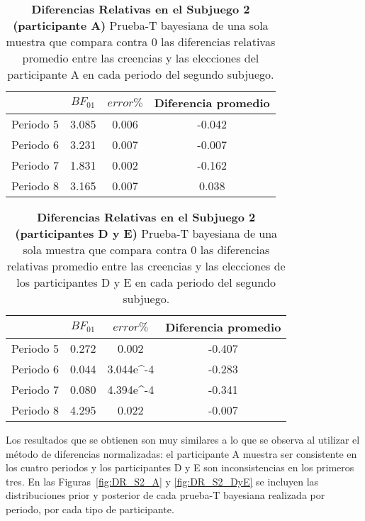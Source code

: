 \begin{table}[h]
\caption[Subjuego 2. Diferencias Relativas. Participante A.]{\textbf{Diferencias Relativas en el Subjuego 2 (participante A)} Prueba-T bayesiana de una sola muestra que compara contra 0 las diferencias relativas promedio entre las creencias y las elecciones del participante A en cada periodo del segundo subjuego.}
\label{DR-S2-A-B}
\centering
\begin{tabular}{l | c c | c}
\toprule
\textbf{} & \textbf{$BF_{01}$} & \textbf{$error\%$} & \textbf{Diferencia promedio}\\
\midrule
Periodo 5 & 3.085 & 0.006 & -0.042\\
Periodo 6 & 3.231 & 0.007 & -0.007\\
Periodo 7 & 1.831 & 0.002 & -0.162\\
Periodo 8 & 3.165 & 0.007 & 0.038\\
\bottomrule
\end{tabular}
\end{table}

\begin{table}[h]
\caption[Subjuego 2. Diferencias Relativas. Participante D y E.]{\textbf{Diferencias Relativas en el Subjuego 2 (participantes D y E)} Prueba-T bayesiana de una sola muestra que compara contra 0 las diferencias relativas promedio entre las creencias y las elecciones de los participantes D y E en cada periodo del segundo subjuego.}
\label{DR-S2-DyE-B}
\centering
\begin{tabular}{l | c c | c}
\toprule
\textbf{} & \textbf{$BF_{01}$} & \textbf{$error\%$} & \textbf{Diferencia promedio}\\
\midrule
Periodo 5 & 0.272 & 0.002 & -0.407\\
Periodo 6 & 0.044 & 3.044e^-4 & -0.283\\
Periodo 7 & 0.080 & 4.394e^-4 & -0.341\\
Periodo 8 & 4.295 & 0.022 & -0.007\\
\bottomrule
\end{tabular}
\end{table}
  
 Los resultados que se obtienen son muy similares a lo que se observa al utilizar el método de diferencias normalizadas: el participante A muestra ser consistente en los cuatro periodos y los participantes D y E son inconsistencias en los primeros tres. En las Figuras~\ref{fig:DR_S2_A} y \ref{fig:DR_S2_DyE} se incluyen las distribuciones prior y posterior de cada prueba-T bayesiana realizada por periodo, por cada tipo de participante.\\

